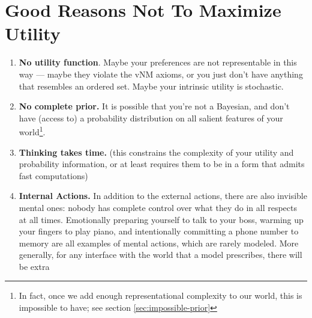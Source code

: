 \documentclass{article}
\begin{document}
	\begin{center}
	\end{center}

	\section{Good Reasons Not To Maximize Utility}
	\begin{enumerate}
		\item \textbf{No utility function}. Maybe your preferences are not representable in this way --- maybe they violate the vNM axioms, or you just don't have anything that resembles an ordered set. Maybe your intrinsic utility is stochastic.
		
		\item \textbf{No complete prior.} It is possible that you're not a Bayesian, and don't have (access to) a probability distribution on all salient features of your world\footnote{In fact, once we add enough representational complexity to our world, this is impossible to have; see section \ref{sec:impossible-prior}}.  
		
		\item \textbf{Thinking takes time.} (this constrains the complexity of your utility and probability information, or at least requires them to be in a form that admits fast computations)
		
		\item \textbf{Internal Actions.} In addition to the external actions, there are also invisible mental ones: nobody has complete control over what they do in all respects at all times. Emotionally preparing yourself to talk to your boss, warming up your fingers to play piano, and intentionally committing a phone number to memory are all examples of mental actions, which are rarely modeled. More generally, for any interface with the world that a model prescribes, there will be extra 
		

\end{enumerate}
\end{document}
